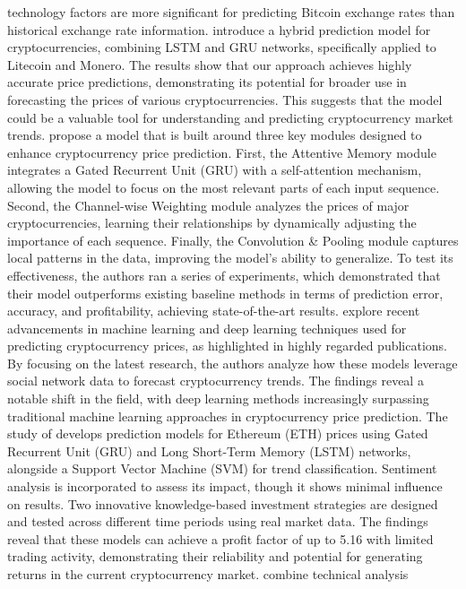 \documentclass[]{interact}
\theoremstyle{plain}%
\theoremstyle{definition}
\theoremstyle{remark}
\begin{document}
technology factors are more significant for predicting Bitcoin exchange
rates than historical exchange rate information. \citep{patel2020}
introduce a hybrid prediction model for cryptocurrencies, combining LSTM
and GRU networks, specifically applied to Litecoin and Monero. The
results show that our approach achieves highly accurate price
predictions, demonstrating its potential for broader use in forecasting
the prices of various cryptocurrencies. This suggests that the model
could be a valuable tool for understanding and predicting cryptocurrency
market trends. \citep{zhang2021} propose a model that is built around
three key modules designed to enhance cryptocurrency price prediction.
First, the Attentive Memory module integrates a Gated Recurrent Unit
(GRU) with a self-attention mechanism, allowing the model to focus on
the most relevant parts of each input sequence. Second, the Channel-wise
Weighting module analyzes the prices of major cryptocurrencies, learning
their relationships by dynamically adjusting the importance of each
sequence. Finally, the Convolution \& Pooling module captures local
patterns in the data, improving the model's ability to generalize. To
test its effectiveness, the authors ran a series of experiments, which
demonstrated that their model outperforms existing baseline methods in
terms of prediction error, accuracy, and profitability, achieving
state-of-the-art results. \citep{nouira2024} explore recent advancements
in machine learning and deep learning techniques used for predicting
cryptocurrency prices, as highlighted in highly regarded publications.
By focusing on the latest research, the authors analyze how these models
leverage social network data to forecast cryptocurrency trends. The
findings reveal a notable shift in the field, with deep learning methods
increasingly surpassing traditional machine learning approaches in
cryptocurrency price prediction. The study of \citep{vieitez2024}
develops prediction models for Ethereum (ETH) prices using Gated
Recurrent Unit (GRU) and Long Short-Term Memory (LSTM) networks,
alongside a Support Vector Machine (SVM) for trend classification.
Sentiment analysis is incorporated to assess its impact, though it shows
minimal influence on results. Two innovative knowledge-based investment
strategies are designed and tested across different time periods using
real market data. The findings reveal that these models can achieve a
profit factor of up to 5.16 with limited trading activity, demonstrating
their reliability and potential for generating returns in the current
cryptocurrency market. \citep{lapitskaya2024} combine technical analysis
\end{document}
